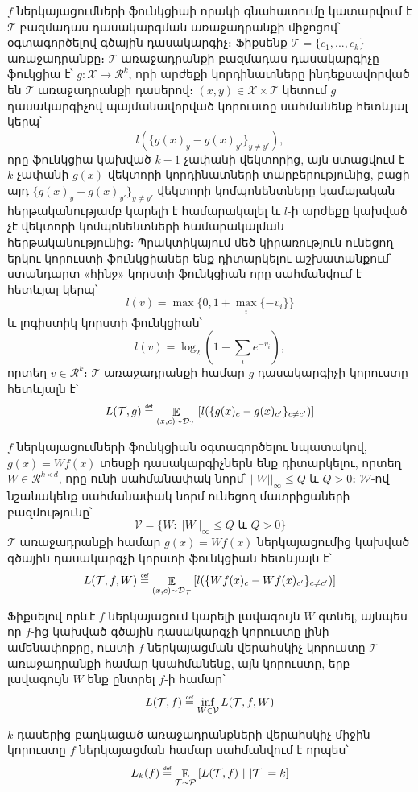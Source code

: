 \documentclass[12pt]{article}
\DeclareMathOperator*{\E}{\mathbb{E}}
\newcommand\defeq{\mathrel{\overset{\makebox[0pt]{\mbox{\normalfont\tiny\sffamily def}}}{=}}}
\begin{document}
\par $f$ ներկայացումների ֆունկցիաի որակի գնահատումը կատարվում է $\mathcal{T}$ բազմադաս դասակարգման առաջադրանքի միջոցով՝ օգտագործելով գծային դասակարգիչ։  Ֆիքսենք $\mathcal{T} = \{c_1, ..., c_{k}\}$ առաջադրանքը։ $\mathcal{T}$ առաջադրանքի բազմադաս դասակարգիչը ֆուկցիա է՝ $g:\mathcal{X} \rightarrow \mathcal{R}^{k}$, որի արժեքի կորդինատները ինդեքսավորված են $\mathcal{T}$ առաջադրանքի դասերով։ $(x, y) \in \mathcal{X} \times \mathcal{T}$ կետում $g$ դասակարգիչով պայմանավորված կորուստը սահմանենք հետևյալ կերպ՝
$$l(\{ g(x)_y-g(x)_{y'}\}_{y \neq y'}  ),$$
որը ֆունկցիա կախված $k-1$ չափանի վեկտորից,  այն ստացվում է $k$ չափանի  $g(x)$ վեկտորի կորդինատների տարբերությունից, բացի այդ $\{ g(x)_y-g(x)_{y'}\}_{y \neq y'}$ վեկտորի կոմպոնենտները կամայական հերթականությամբ կարելի է համարակալել և $l$-ի արժեքը կախված չէ վեկտորի կոմպոնենտների համարակալման հերթականությունից։  Պրակտիկայում մեծ կիրառություն ունեցող երկու կորուստի ֆունկցիաներ ենք դիտարկելու աշխատանքում՝ ստանդարտ «հինջ» կորստի ֆունկցիան որը սահմանվում է հետևյալ կերպ՝
$$l(v) = \max\{0, 1+\max_{i}\{-v_i\}\} $$ և լոգիստիկ կորստի ֆունկցիան՝
$$l(v) = \log_2(1+\sum_{i}{e^{-v_i}}),$$
որտեղ $v \in \mathcal{R}^{k}$։ $\mathcal{T}$ առաջադրանքի համար $g$ դասակարգիչի կորուստը հետևյալն է՝
$$L(\mathcal{T}, g) \defeq \E_{(x, c) \sim \mathcal{D}_{\mathcal{T}}} \left [ l(\{ g(x)_c-g(x)_{c'}\}_{c \neq c'}  ) \right ]$$

$f$ ներկայացումների ֆունկցիան օգտագործելու նպատակով,  $g(x) = Wf(x)$ տեսքի դասակարգիչներն ենք դիտարկելու, որտեղ $W \in \mathcal{R}^{k\times d }$, որը ունի սահմանափակ նորմ՝ $||W||_{\infty} \leq Q \text{ և }Q >0։$
$\mathcal{W}$-ով նշանակենք սահմանափակ նորմ ունեցող մատրիցաների բազմությունը՝
$$\mathcal{V} = \{W: ||W||_{\infty} \leq Q \text{ և } Q > 0\}$$
 $\mathcal{T}$ առաջադրանքի համար $g(x) = Wf(x)$ ներկայացումից կախված գծային դասակարգչի կորստի ֆունկցիան հետևյալն է՝
$$L(\mathcal{T}, f, W) \defeq \E_{(x, c) \sim \mathcal{D}_{\mathcal{T}}} \left [ l(\{ Wf(x)_c-Wf(x)_{c'}\}_{c \neq c'}  ) \right ]$$
 
 Ֆիքսելով որևէ $f$ ներկայացում կարելի լավագույն $W$ գտնել, այնպես որ $f$-ից կախված գծային դասակարգչի կորուստը լինի ամենափոքրը, ուստի $f$ ներկայացման վերահսկիչ կորուստը $\mathcal{T}$ առաջադրանքի համար կսահմանենք, այն կորուստը, երբ լավագույն $W$ ենք ընտրել $f$-ի համար՝
 $$L(\mathcal{T}, f) \defeq \inf_{W \in \mathcal{V}} L(\mathcal{T}, f, W)$$


\begin{defination}
$k$ դասերից բաղկացած առաջադրանքների վերահսկիչ միջին կորուստը $f$ ներկայացման համար սահմանվում է որպես՝ 
$$L_{k}(f) \defeq \E_{\mathcal{T} \sim \mathcal{P}} \left [L (\mathcal{T}, f) \text{ } | \text{ } |\mathcal{T}| = k\right]$$
\end{defination}
\end{document}
